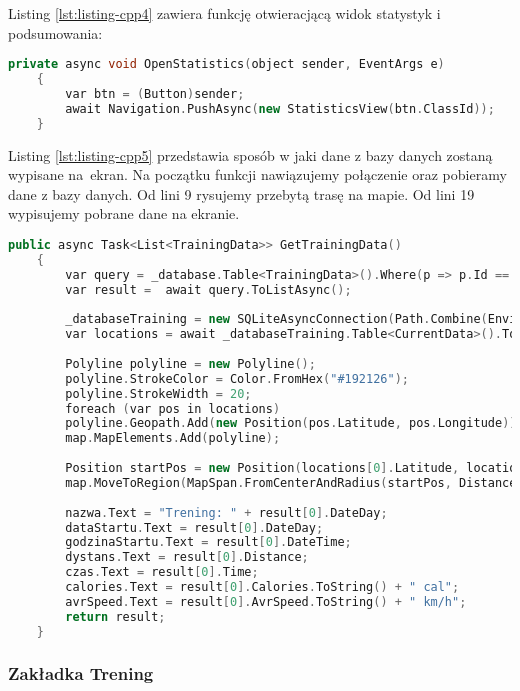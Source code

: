Listing \ref{lst:listing-cpp4} zawiera funkcję otwieracjącą widok statystyk i podsumowania:
\begin{lstlisting}[caption=Otwieranie widoku statystyk i podsumowania, label={lst:listing-cpp4}, language=C++]
	private async void OpenStatistics(object sender, EventArgs e)
	{
		var btn = (Button)sender;
		await Navigation.PushAsync(new StatisticsView(btn.ClassId));
	}
\end{lstlisting}

Listing \ref{lst:listing-cpp5} przedstawia sposób w jaki dane z bazy danych zostaną wypisane na~ekran. Na początku funkcji nawiązujemy połączenie oraz pobieramy dane z bazy danych. Od lini 9 rysujemy przebytą trasę na mapie. Od lini 19 wypisujemy pobrane dane na ekranie.
\begin{lstlisting}[caption=Wypisanie danych z bazy danych na ekran, label={lst:listing-cpp5}, language=C++]
	public async Task<List<TrainingData>> GetTrainingData()
	{
		var query = _database.Table<TrainingData>().Where(p => p.Id == buttonId);
		var result =  await query.ToListAsync();
		
		_databaseTraining = new SQLiteAsyncConnection(Path.Combine(Environment.GetFolderPath(Environment.SpecialFolder.LocalApplicationData), result[0].TrainingDatabase));
		var locations = await _databaseTraining.Table<CurrentData>().ToListAsync();
		
		Polyline polyline = new Polyline();
		polyline.StrokeColor = Color.FromHex("#192126");
		polyline.StrokeWidth = 20;
		foreach (var pos in locations)
		polyline.Geopath.Add(new Position(pos.Latitude, pos.Longitude));
		map.MapElements.Add(polyline);
		
		Position startPos = new Position(locations[0].Latitude, locations[0].Longitude);
		map.MoveToRegion(MapSpan.FromCenterAndRadius(startPos, Distance.FromKilometers(1)));
		
		nazwa.Text = "Trening: " + result[0].DateDay;
		dataStartu.Text = result[0].DateDay;
		godzinaStartu.Text = result[0].DateTime;
		dystans.Text = result[0].Distance;
		czas.Text = result[0].Time;
		calories.Text = result[0].Calories.ToString() + " cal";
		avrSpeed.Text = result[0].AvrSpeed.ToString() + " km/h";
		return result;
	}
\end{lstlisting}

\subsubsection{Zakładka Trening} %

